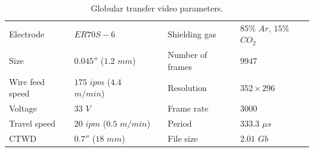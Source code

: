 \begin{table}
\centering
\caption[Globular transfer video parameters]{Globular transfer video parameters.}
\label{table:glob_params}
\begin{tabular}{|l|l|lll}
\cline{1-2} \cline{4-5}
Electrode       & $ER70S-6$             & \multicolumn{1}{l|}{} & \multicolumn{1}{l|}{Shielding gas}     & \multicolumn{1}{l|}{$85\%$ $Ar$, $15\%$ $CO_2$} \\ \cline{1-2} \cline{4-5} 
Size            & $0.045''$ ($1.2$ $mm$)     & \multicolumn{1}{l|}{} & \multicolumn{1}{l|}{Number of frames}  & \multicolumn{1}{l|}{$9947$}              \\ \cline{1-2} \cline{4-5} 
Wire feed speed & $175$ $ipm$ ($4.4$ $m/min$) & \multicolumn{1}{l|}{} & \multicolumn{1}{l|}{Resolution}        & \multicolumn{1}{l|}{$352 \times 296$}           \\ \cline{1-2} \cline{4-5} 
Voltage         & $33$ $V$                 & \multicolumn{1}{l|}{} & \multicolumn{1}{l|}{Frame rate} & \multicolumn{1}{l|}{$3000$}              \\ \cline{1-2} \cline{4-5} 
Travel speed    & $20$ $ipm$ ($0.5$ $m/min$)  & \multicolumn{1}{l|}{} & \multicolumn{1}{l|}{Period}            & \multicolumn{1}{l|}{$333.3$ $\mu s$}           \\ \cline{1-2} \cline{4-5} 
CTWD & $0.7''$ ($18$ $mm$) &\multicolumn{1}{l|}{} & \multicolumn{1}{l|}{File size}            & \multicolumn{1}{l|}{$2.01$ $Gb$}  \\ \cline{1-2}\cline{4-5} 
\end{tabular}
\end{table}

